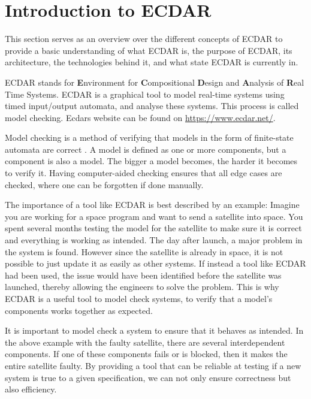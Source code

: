\section{Introduction to ECDAR}\label{sec:introduction-to-ecdar}
\commondisclaimer

This section serves as an overview over the different concepts of ECDAR to provide a basic understanding of what ECDAR is, the purpose of ECDAR, its architecture, the technologies behind it, and what state ECDAR is currently in.

ECDAR stands for \textbf{E}nvironment for \textbf{C}ompositional \textbf{D}esign and \textbf{A}nalysis of \textbf{R}eal Time Systems.
ECDAR is a graphical tool to model real-time systems using timed input/output automata, and analyse these systems. 
This process is called model checking. Ecdars website can be found on \href{https://www.ecdar.net/}{https://www.ecdar.net/}.

Model checking is a method of verifying that models in the form of finite-state automata are correct \cite{modelchecking-handbook}. A model is defined as one or more components, but a component is also a model.
The bigger a model becomes, the harder it becomes to verify it. 
Having computer-aided checking ensures that all edge cases are checked, where one can be forgotten if done manually.
 
The importance of a tool like ECDAR is best described by an example:
Imagine you are working for a space program and want to send a satellite into space.
You spent several months testing the model for the satellite to make sure it is correct and everything is working as intended.
The day after launch, a major problem in the system is found. However since the satellite is already in space, it is not possible to just update it as easily as other systems. If instead a tool like ECDAR had been used, the issue would have been identified before the satellite was launched, thereby allowing the engineers to solve the problem.
This is why ECDAR is a useful tool to model check systems, to verify that a model's components works together as expected.


It is important to model check a system to ensure that it behaves as intended.
In the above example with the faulty satellite, there are several interdependent components.
If one of these components fails or is blocked, then it makes the entire satellite faulty.
By providing a tool that can be reliable at testing if a new system is true to a given specification, we can not only ensure correctness but also efficiency.


